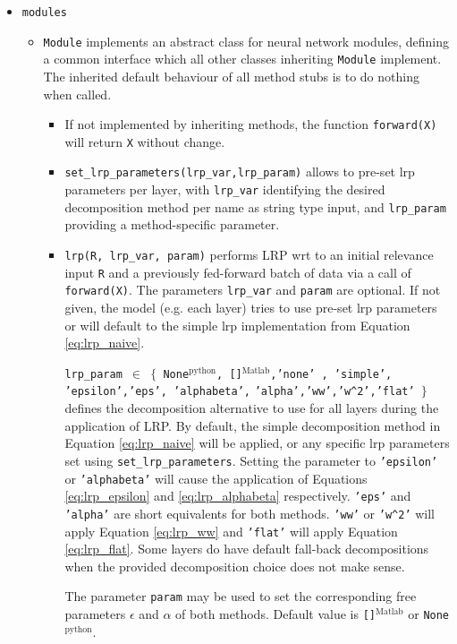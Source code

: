 \documentclass[a4wide]{article}
\newcommand{\mat}{$^\text{Matlab}$}
\newcommand{\py}{$^\text{python}$}
\begin{document}
\begin{itemize}
\begin{itemize}
		
	\end{itemize}
\item \texttt{modules}
	\begin{itemize}
	
		\item \texttt{Module} implements an abstract class for neural network modules, defining a common interface which all other classes inheriting \texttt{Module} implement. The inherited default behaviour of all method stubs is to do nothing when called.
	\begin{itemize}
	\item If not implemented by inheriting methods, the function \texttt{forward(X)} will return \texttt{X} without change.
	\item \texttt{set\_lrp\_parameters(lrp\_var,lrp\_param)} allows to pre-set lrp parameters per layer, with \texttt{lrp\_var} identifying the desired decomposition method per name as string type input, and \texttt{lrp\_param} providing a method-specific parameter.
	\item \texttt{lrp(R, lrp\_var, param)} performs LRP wrt to an initial relevance input \texttt{R} and a previously fed-forward batch of data via a call of \texttt{forward(X)}. The parameters \texttt{lrp\_var} and \texttt{param} are optional. If not given,  the model (e.g. each layer) tries to use pre-set lrp parameters or will default to the simple lrp implementation from Equation \ref{eq:lrp_naive}.  
				
				\texttt{lrp\_param $\in$ $\lbrace$ None\py, []\mat,'none' , 'simple', 'epsilon','eps', 'alphabeta',} \texttt{'alpha','ww','w\^{}2','flat' $\rbrace$} defines the decomposition alternative to use for all layers during the application of LRP. By default, the simple decomposition method in Equation \ref{eq:lrp_naive} will be applied, or any specific lrp parameters set using \texttt{set\_lrp\_parameters}. Setting the parameter to \texttt{'epsilon'} or \texttt{'alphabeta'} will cause the application of Equations \ref{eq:lrp_epsilon} and \ref{eq:lrp_alphabeta} respectively. \texttt{'eps'} and \texttt{'alpha'} are short equivalents for both methods. \texttt{'ww'} or \texttt{'w\^{}2'} will apply Equation \ref{eq:lrp_ww} and \texttt{'flat'} will apply Equation \ref{eq:lrp_flat}. Some layers do have default fall-back decompositions when the provided decomposition choice does not make sense.
				
				The parameter \texttt{param} may be used to set the corresponding free parameters $\epsilon$ and $\alpha$ of both methods. Default value is \texttt{[]\mat} or \texttt{None\py}.
	\end{itemize}			
			

\end{itemize}
\end{itemize}
\end{document}
